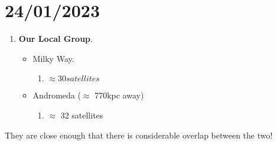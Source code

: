 \documentclass[a4paper]{article}
\begin{document}
\section{24/01/2023}
\begin{enumerate}
  \item {\bf Our Local Group}.
    \begin{itemize}
      \item Milky Way.
        \begin{enumerate}
          \item $\approx 30 satellites$
        \end{enumerate}
      \item Andromeda ($\approx$ 770kpc away)
        \begin{enumerate}
          \item $\approx$ 32 satellites
        \end{enumerate}
    \end{itemize}
\end{enumerate}
They are close enough that there is considerable overlap between the two!
\end{document}
